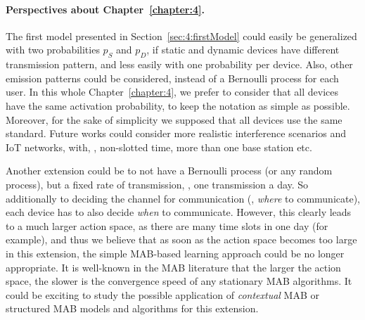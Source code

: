 \paragraph{Perspectives about \textbf{Chapter~\ref{chapter:4}}.}




The first model presented in Section~\ref{sec:4:firstModel} could easily be generalized with two probabilities $p_S$ and $p_D$, if static and dynamic devices have different transmission pattern, and less easily with one probability per device.
Also, other emission patterns could be considered, instead of a Bernoulli process for each user.
In this whole Chapter~\ref{chapter:4}, we prefer to consider that all devices have the same activation probability, to keep the notation as simple as possible.
%
Moreover, for the sake of simplicity we supposed that all devices use the same standard.
Future works could consider more realistic interference scenarios and IoT networks, with, \eg, non-slotted time, more than one base station etc.

Another extension could be to not have a Bernoulli process (or any random process), but a fixed rate of transmission, \eg, one transmission a day.
So additionally to deciding the channel for communication (\ie, \emph{where} to communicate), each device has to also decide \emph{when} to communicate.
However, this clearly leads to a much larger action space, as there are many time slots in one day (for example), and thus we believe that as soon as the action space becomes too large in this extension, the simple MAB-based learning approach could be no longer appropriate.
It is well-known in the MAB literature that the larger the action space, the slower is the convergence speed of any stationary MAB algorithms.
It could be exciting to study the possible application of \emph{contextual} MAB \cite{Li10,Luo18} or structured MAB \cite{Combes17} models and algorithms for this extension.


